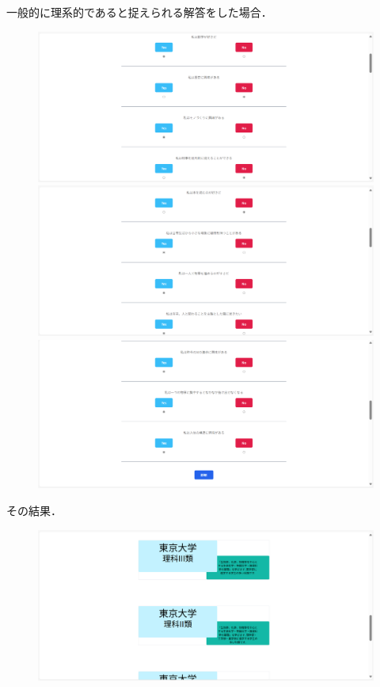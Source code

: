 \documentclass[a4j, titlepage]{jarticle}
\begin{document}
\begin{itemize}
一般的に理系的であると捉えられる解答をした場合．
\begin{figure}[h]
\includegraphics{dousakekka-4.png}
\includegraphics{dousakekka-5.png}
\includegraphics{dousakekka-6.png}
\end{figure}
その結果．
\begin{figure}[h]
\includegraphics{dousakekka-7.png}

\end{figure}
\end{itemize}
\end{document}
